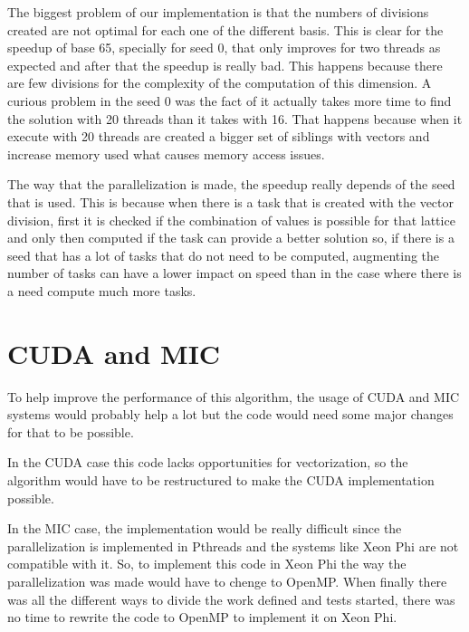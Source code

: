 \documentclass[conference]{IEEEtran}
\begin{document}
The biggest problem of our implementation is that the numbers of divisions created are not optimal for each one of the different basis. This is clear for the speedup of base 65, specially for seed 0, that only improves for two threads as expected and after that the speedup is really bad. This happens because there are few divisions for the complexity of the computation of this dimension. A curious problem in the seed 0 was the fact of it actually takes more time to find the solution with 20 threads than it takes with 16. That happens because when it execute with 20 threads are created a bigger set of siblings with vectors and increase memory used what causes memory access issues. 

The way that the parallelization is made, the speedup really depends of the seed that is used. This is because when there is a task that is created with the vector division, first it is checked if the combination of values is possible for that lattice and only then computed if the task can provide a better solution so, if there is a seed that has a lot of tasks that do not need to be computed, augmenting the number of tasks can have a lower impact on speed than in the case where there is a need compute much more tasks.

\section{CUDA and MIC}
To help improve the performance of this algorithm, the usage of CUDA and MIC systems would probably help a lot but the code would need some major changes for that to be possible.

In the CUDA case this code lacks opportunities for vectorization, so the algorithm would have to be restructured to make the CUDA implementation possible.

In the MIC case, the implementation would be really difficult since the parallelization is implemented in Pthreads and the systems like Xeon Phi are not compatible with it. So, to implement this code in Xeon Phi the way the parallelization was made would have to chenge to OpenMP. When finally there was all the different ways to divide the work defined and tests started, there was no time to rewrite the code to OpenMP to implement it on Xeon Phi.
\end{document}
